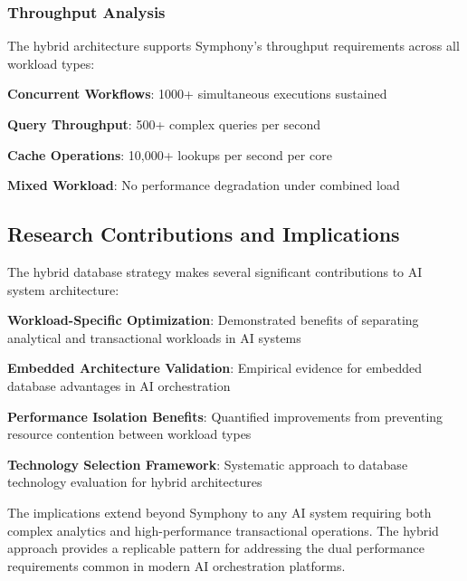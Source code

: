 \subsubsection*{Throughput Analysis}

The hybrid architecture supports Symphony's throughput requirements across all workload types:

\begin{compactlist}
    \item \textbf{Concurrent Workflows}: 1000+ simultaneous executions sustained
    \item \textbf{Query Throughput}: 500+ complex queries per second
    \item \textbf{Cache Operations}: 10,000+ lookups per second per core
    \item \textbf{Mixed Workload}: No performance degradation under combined load
\end{compactlist}

\subsection*{Research Contributions and Implications}

The hybrid database strategy makes several significant contributions to AI system architecture:

\begin{expandedlist}
    \item \textbf{Workload-Specific Optimization}: Demonstrated benefits of separating analytical and transactional workloads in AI systems
    \item \textbf{Embedded Architecture Validation}: Empirical evidence for embedded database advantages in AI orchestration
    \item \textbf{Performance Isolation Benefits}: Quantified improvements from preventing resource contention between workload types
    \item \textbf{Technology Selection Framework}: Systematic approach to database technology evaluation for hybrid architectures
\end{expandedlist}

The implications extend beyond Symphony to any AI system requiring both complex analytics and high-performance transactional operations. The hybrid approach provides a replicable pattern for addressing the dual performance requirements common in modern AI orchestration platforms.
